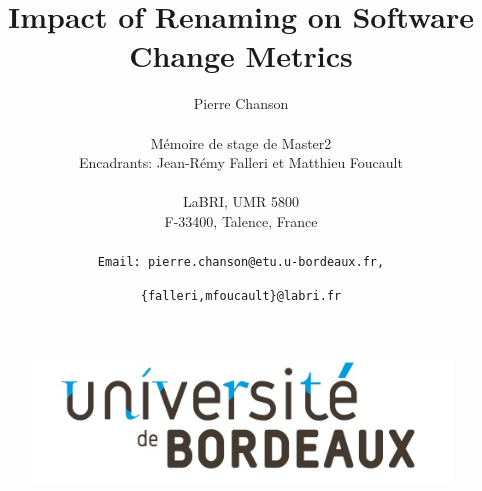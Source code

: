 \documentclass[12pt,a4paper]{article}
\title{\vspace{4cm}\textbf{Impact of Renaming on Software Change Metrics}\vspace{3cm}}
\author{
Pierre Chanson\\\\
Mémoire de stage de Master2\\
Encadrants: Jean-Rémy Falleri et Matthieu Foucault\\\\
LaBRI, UMR 5800\\
F-33400, Talence, France\\\\
\texttt{Email: pierre.chanson@etu.u-bordeaux.fr,}\and
\texttt{\{falleri,mfoucault\}@labri.fr}\\
}
\begin{document}
\begin{figure}[t]
\center
\includegraphics[scale=0.25]{data/figures/UnivBordeaux.jpg}
\end{figure}
\maketitle
\newpage
\tableofcontents
\newpage









\newpage


\newpage
\begin{appendices}

\end{appendices} 
\end{document}
